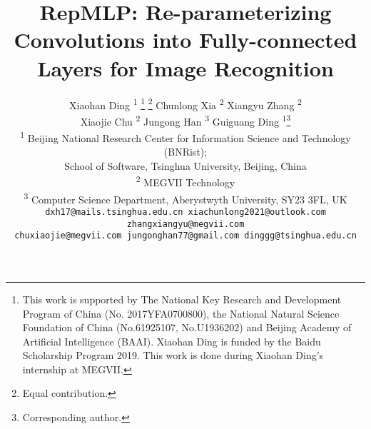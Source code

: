\documentclass[10pt,twocolumn,letterpaper]{article}
\makeatletter
\newcommand{\printfnsymbol}[1]{\textsuperscript{\@fnsymbol{#1}}}
\makeatother
\begin{document}
\title{RepMLP: Re-parameterizing Convolutions into Fully-connected Layers for Image Recognition}

\author{Xiaohan Ding \textsuperscript{1} \thanks{This work is supported by The National Key Research and Development Program of China (No. 2017YFA0700800), the National Natural Science Foundation of China (No.61925107, No.U1936202) and Beijing Academy of Artificial Intelligence (BAAI). Xiaohan Ding is funded by the Baidu Scholarship Program 2019. This work is done during Xiaohan Ding's internship at MEGVII.} \thanks{Equal contribution.} \quad Chunlong Xia \textsuperscript{2}\printfnsymbol{2} \quad Xiangyu Zhang \textsuperscript{2} \\ Xiaojie Chu \textsuperscript{2} \quad Jungong Han \textsuperscript{3} \quad Guiguang Ding \textsuperscript{1}\thanks{Corresponding author.} \\
	\textsuperscript{1} Beijing National Research Center for Information Science and Technology (BNRist); \\School of Software, Tsinghua University, Beijing, China \\
	\textsuperscript{2} MEGVII Technology \\
	\textsuperscript{3} Computer Science Department, Aberystwyth University, SY23 3FL, UK \\
	\tt\small dxh17@mails.tsinghua.edu.cn \quad xiachunlong2021@outlook.com \quad zhangxiangyu@megvii.com\\
	\tt\small chuxiaojie@megvii.com \quad jungonghan77@gmail.com \quad dinggg@tsinghua.edu.cn\\
}

\maketitle
\ificcvfinal\thispagestyle{empty}\fi
\end{document}
